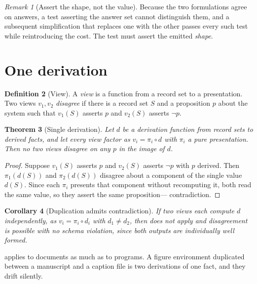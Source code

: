 \documentclass[11pt,a4paper]{article}
\theoremstyle{plain}
\newtheorem{theorem}{Theorem}[section]
\newtheorem{corollary}[theorem]{Corollary}
\theoremstyle{definition}
\newtheorem{definition}[theorem]{Definition}
\theoremstyle{remark}
\newtheorem{remark}[theorem]{Remark}
\begin{document}
\begin{remark}[Assert the shape, not the value]
\label{rem:assert-shape}
Because the two formulations agree on answers, a test asserting the answer set
cannot distinguish them, and a subsequent simplification that replaces one
with the other passes every such test while reintroducing the cost. The test
must assert the emitted \emph{shape}.
\end{remark}

\section{One derivation}
\label{sec:single}

\begin{definition}[View]
\label{def:view}
A \emph{view} is a function from a record set to a presentation. Two views
$v_1, v_2$ \emph{disagree} if there is a record set $S$ and a proposition $p$
about the system such that $v_1(S)$ asserts $p$ and $v_2(S)$ asserts
$\neg p$.
\end{definition}

\begin{theorem}[Single derivation]
\label{thm:single}
Let $d$ be a derivation function from record sets to derived facts, and let
every view factor as $v_i = \pi_i \circ d$ with $\pi_i$ a pure presentation.
Then no two views disagree on any $p$ in the image of $d$.
\end{theorem}

\begin{proof}
Suppose $v_1(S)$ asserts $p$ and $v_2(S)$ asserts $\neg p$ with $p$ derived.
Then $\pi_1(d(S))$ and $\pi_2(d(S))$ disagree about a component of the single
value $d(S)$. Since each $\pi_i$ presents that component without recomputing
it, both read the same value, so they assert the same proposition---
contradiction.
\end{proof}

\begin{corollary}[Duplication admits contradiction]
\label{cor:duplication}
If two views each compute $d$ independently, as $v_i = \pi_i \circ d_i$ with
$d_1 \neq d_2$, then  does not apply and disagreement is
possible with no schema violation, since both outputs are individually well
formed.
\end{corollary}

 applies to documents as much as to programs. A figure
environment duplicated between a manuscript and a caption file is two
derivations of one fact, and they drift silently.
\end{document}
